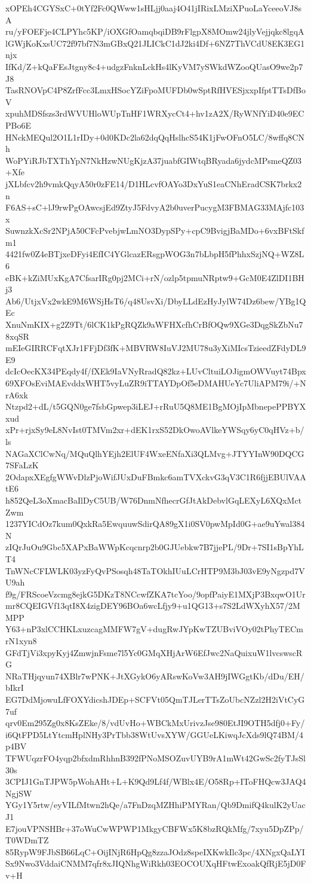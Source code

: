 xOPEh4CGYSxC+0tYf2Fc0QWww1sHLjj0aaj4O41jIRixLMziXPuoLaYceeoVJ8sA
ru/yFOEFje4CLPYhc5KP/iOXGfOamqbqiDB9rFlgpX8MOmw24jlyVejjqkc8lgqA
lGWjKoKxsUC72f97bf7N3mGBxQ21JLICkC1dJ2ki4Df+6NZ7ThVCdU8EK3EG1njx
IfKd/Z+kQaFEsJtgny8c4+udgzFnknLckHs4lKyVM7ySWkdWZooQUasO9we2p7J8
TasRNOVpC4P8ZrfFcc3LmxHSocYZiFpoMUFDb0wSptRfHVESjxxpIfptTTsDfBoV
xpuhMDSfszs3rdWVUHloWUpTnHF1WRXycCt4+hv1zA2X/RyWNfYiD40e9ECPBo6E
HNckMEQul2O1L1rIDy+0d0KDc2la62dqQqHslhcS54K1jFwOFnO5LC/8wffq8CNh
WoPYiRJbTXThYpN7NkHzwNUgKjzA37juabfGIWtqBRyada6jydcMPsmeQZ03+Xfe
jXLbfcv2h9vmkQqyA50r0zFE14/D1HLcvfOAYo3DxYuS1eaCNhEradCSK7brkx2n
F6AS+sC+lJ9rwPgOAwcsjEd9ZtyJ5FdvyA2b0uverPucygM3FBMAG33MAjfc103x
SuwnzkXcSr2NPjA50CFcPvebjwLmNO3DypSPy+cpC9BvigjBaMDo+6vxBFtSkfm1
4421fw0Z4eBTjxeDFyi4EfIC4YGlcazERsgpWOG3n7bLbpH5fPhhxSzjNQ+WZ8L6
eBK+kZiMUxKgA7CfsarIRg0pj2MCi+rN/ozlp5tpmuNRptw9+GcM0E4ZlDI1BHj3
Ab6/UtjxVx2wkE9M6WSjHsT6/q48UsvXi/DbyLLdEzHyJylW74Dz6bew/YBg1QEc
XnuNmKIX+g2Z9Tt/6lCK1kPgRQZk9aWFHXcfhCrBfOQw9XGe3DqgSkZbNu78xqSR
mEIeGIRRCFqtXJr1FFjDf3fK+MBVRW8IuVJ2MU78u3yXiMIcsTzieedZFdyDL9E9
dcIcOecKX34PEqdy4f/fXEk9IaVNyRradQ82kz+LUvCltuiLOJigmOWVuyt74Bpx
69XFOsEviMAEvddxWHT5vyLuZR9iTTAYDpOf5eDMAHUeYc7UliAPM79i/+NrA6xk
Ntzpd2+dL/t5GQN0ge7fsbGpwep3iLEJ+rRuU5Q8ME1BgMOjIpMbnepePPBYXxud
xPr+rjxSy9eL8NvIst0TMVm2xr+dEK1rxS52DkOwoAVlkeYWSqy6yC0qHVz+b/ls
NAGaXClCwNq/MQuQlhYEjh2ElUF4WxeENfaXi3QLMvg+JTYYInW90DQCG7SFaLzK
2OdapxXEgfgWWvDlzPjoWifJUxDuFBmkc6amTVXckvG3qV3C1R6fjjEBUlVAAtE6
h852QeL3oXmacBaIlDyC5UB/W76DnmNfhecrGfJtAkDebvlGqLEXyL6XQxMctZwm
1237YICdOz7kum0QxkRa5EwquuwSdirQA89gX1i0SV0pwMpId0G+ae9uYwal384N
zIQrJuOu9Gbc5XAPxBaWWpKcqcnrp2b0GJUebkw7B7jjePL/9Dr+7SI1sBpYhLT4
TnWNcCFLWLK03yzFyQvPSosqh48TaTOkhIUuLCrHTP9M3bJ03vE9yNgzpd7VU9ah
f9g/FRScoeVzcmg8ejkG5DKzT8NCcwfZKA7tcYoo/9opfPaiyE1MXjP3BxqwO1Ur
mr8CQEIGVf13qtI8X4zigDEY96BOa6wcLfjy9+u1QG13+s7S2LdWXyhX57/2MMPP
Y63+nP3xlCCHKLxuzcagMMFW7gV+dugRwJYpKwTZUBviVOy02tPhyTECmrN1xyn8
GFdTjVi3xpyKyj4ZmwjnFsme7l5Yc0GMqXHjArW6EfJwc2NaQuixuW1lvcswscRG
NRaTHjqyun74XBlr7wPNK+JtXGykO6yARswKoVw3AH9jIWGgtKb/dDu/EH/bIkrI
EG7DdMjowuLfFOXYdicshJDEp+SCFVt05QmTJLerTTsZoUbcNZzl2H2iVtCyG7uf
qrv0Em295Zg0x8KsZEke/8/vdUvHo+WBCkMxUrivzJse980EtJI9OTH5dfj0+Fy/
i6QtFPD5LtYtcmHplNHy3PrTbb38WtUvsXYW/GGUeLKiwqJcXds9lQ74BM/4p4BV
TFWUqzrFO4yqp2bfxdmRhhnB392fPNoMSOZuvUYB9rA1mWt42GwSc2fyTJsSl30s
3CPIJ1GnTJPW5pWohAHt+L+K9Qd9Lf4f/WBlx4E/O58Rp+IToFHQcw3JAQ4NgjSW
YGy1Y5rtw/eyVILfMtwn2hQe/a7FnDzqMZHhiPMYRan/Qb9DmifQ4kulK2yUacJ1
E7jouVPNSHBr+37oWuCwWPWP1MkgyCBFWx5K8bzRQkMfg/7xyu5DpZPp/T0WDmTZ
85RypW9FJbSB66LqC+OijINjR6HpQg8zzaJOdz8speIXKwkIlc3pc/4XNgxQaLYI
Sx9Nwo3VddaiCNMM7qfr8xJIQNhgWiRkh03EOCOUXqHFtwExoakQfRjE5jD0Fv+H
